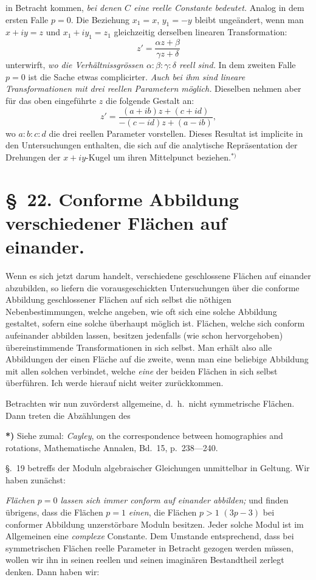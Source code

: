 \documentclass{article}
\begin{document}
in Betracht kommen, \emph{bei denen $C$ eine reelle Constante bedeutet.} Analog in dem ersten Falle $p = 0$. Die Beziehung $x_{1} = x$, $y_{1} = - y$ bleibt ungeändert, wenn man $x + iy = z$ und $x_{1} + iy_{1} = z_{1}$ gleichzeitig derselben linearen Transformation:
\[ z' = \frac{\alpha z + \beta}{\gamma z + \delta} \]
unterwirft, \emph{wo die Verhältnissgrössen $\alpha : \beta : \gamma : \delta$ reell sind.} In dem zweiten Falle $p = 0$ ist die Sache etwas complicirter. \emph{Auch bei ihm sind lineare Transformationen mit drei reellen Parametern möglich.} Dieselben nehmen aber für das oben eingeführte $z$ die folgende Gestalt an:
\[ z' = \frac{(a + ib)z + (c + id)}{- (c - id)z + (a - ib)}, \]
wo $a : b : c : d$ die drei reellen Parameter vorstellen. Dieses Resultat ist implicite in den Untersuchungen enthalten, die sich auf die analytische Repräsentation der Drehungen der $x + iy$-Kugel um ihren Mittelpunct beziehen.${}^{*)}$

\section*{§~22. Conforme Abbildung verschiedener Flächen auf einander.}

Wenn es sich jetzt darum handelt, verschiedene geschlossene Flächen auf einander abzubilden, so liefern die vorausgeschickten Untersuchungen über die conforme Abbildung geschlossener Flächen auf sich selbst die nöthigen Nebenbestimmungen, welche angeben, wie oft sich eine solche Abbildung gestaltet, sofern eine solche überhaupt möglich ist. Flächen, welche sich conform aufeinander abbilden lassen, besitzen jedenfalls (wie schon hervorgehoben) übereinstimmende Transformationen in sich selbst. Man erhält also alle Abbildungen der einen Fläche auf die zweite, wenn man eine beliebige Abbildung mit allen solchen verbindet, welche \emph{eine} der beiden Flächen in sich selbst überführen. Ich werde hierauf nicht weiter zurückkommen.

Betrachten wir nun zuvörderst allgemeine, d.\ h.\ nicht symmetrische Flächen. Dann treten die Abzählungen des

\textbf{*)} Siehe zumal: \emph{Cayley}, on the correspondence between homographies and rotations, Mathematische Annalen, Bd.~15, p.~238---240.

§.~19 betreffs der Moduln algebraischer Gleichungen unmittelbar in Geltung. Wir haben zunächst:

\emph{Flächen $p = 0$ lassen sich immer conform auf einander abbilden;}
und finden übrigens, dass die Flächen $p = 1$ \emph{einen}, die Flächen $p > 1$ $(3p - 3)$ bei conformer Abbildung unzerstörbare Moduln besitzen. Jeder solche Modul ist im Allgemeinen eine \emph{complexe} Constante. Dem Umstande entsprechend, dass bei symmetrischen Flächen reelle Parameter in Betracht gezogen werden müssen, wollen wir ihn in seinen reellen und seinen imaginären Bestandtheil zerlegt denken. Dann haben wir:
\end{document}
